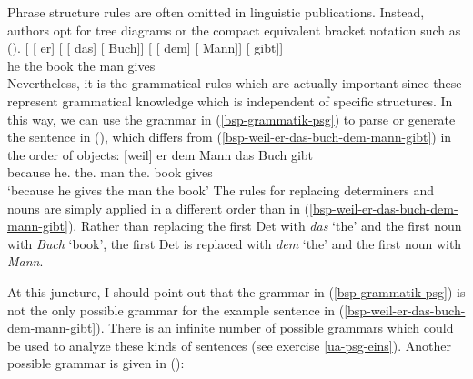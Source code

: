 Phrase structure rules are often omitted in linguistic publications. Instead, authors opt for tree diagrams or the compact equivalent bracket notation
such as ().
\ea
\gll {}[ [ er] [ [ das] [ Buch]]  [ [ dem] [ Mann]] [ gibt]]\\
     {}         {}        he  {}        {}       the  {}       book    {}        {}       the  {}       man     {}      gives\\  
\z
Nevertheless, it is the grammatical rules which are actually important since these represent grammatical knowledge which is independent of specific structures.
In this way, we can use the grammar in (\ref{bsp-grammatik-psg}) to parse or generate the sentence
in (), which differs from (\ref{bsp-weil-er-das-buch-dem-mann-gibt}) in the order of objects: 
\ea
\gll {}[weil] er dem Mann das Buch gibt\\
	 {}\spacebr{}because he.\nom{} the.\dat{} man the.\acc{} book gives\\
\glt `because he gives the man the book'
\z
The rules for replacing determiners and nouns are simply applied in a different order than in (\ref{bsp-weil-er-das-buch-dem-mann-gibt}). Rather than replacing the first Det with \emph{das} `the' and the first noun with \emph{Buch} `book', the first Det is replaced with \emph{dem} `the' and the first noun with \emph{Mann}.

At this juncture, I should point out that the grammar in (\ref{bsp-grammatik-psg}) is not the only possible grammar for the example sentence in
(\ref{bsp-weil-er-das-buch-dem-mann-gibt}). There is an infinite\label{page-unendlich-viele-grammatiken} number of possible grammars which could
be used to analyze these kinds of sentences (see exercise \ref{ua-psg-eins}). Another possible grammar is given in ():

